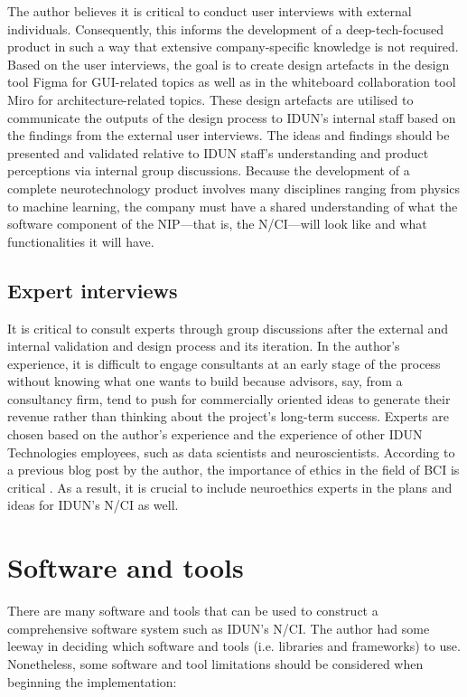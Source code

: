 The author believes it is critical to conduct user interviews with external individuals. Consequently, this informs the development of a deep-tech-focused product in such a way that extensive company-specific knowledge is not required. Based on the user interviews, the goal is to create design artefacts in the design tool Figma for GUI-related topics as well as in the whiteboard collaboration tool Miro for architecture-related topics. These design artefacts are utilised to communicate the outputs of the design process to IDUN’s internal staff based on the findings from the external user interviews. The ideas and findings should be presented and validated relative to IDUN staff’s understanding and product perceptions via internal group discussions. Because the development of a complete neurotechnology product involves many disciplines ranging from physics to machine learning, the company must have a shared understanding of what the software component of the NIP—that is, the N/CI—will look like and what functionalities it will have.

\subsection{Expert interviews}
\label{chapter3-expert-interviews}

It is critical to consult experts through group discussions after the external and internal validation and design process and its iteration. In the author’s experience, it is difficult to engage consultants at an early stage of the process without knowing what one wants to build because advisors, say, from a consultancy firm, tend to push for commercially oriented ideas to generate their revenue rather than thinking about the project’s long-term success. Experts are chosen based on the author’s experience and the experience of other IDUN Technologies employees, such as data scientists and neuroscientists. According to a previous blog post by the author, the importance of ethics in the field of BCI is critical \citep{burger_influence_2021}. As a result, it is crucial to include neuroethics experts in the plans and ideas for IDUN’s N/CI as well.

\section{Software and tools}
\label{chapter3-software-and-tools}

There are many software and tools that can be used to construct a comprehensive software system such as IDUN’s N/CI. The author had some leeway in deciding which software and tools (i.e. libraries and frameworks) to use. Nonetheless, some software and tool limitations should be considered when beginning the implementation:

